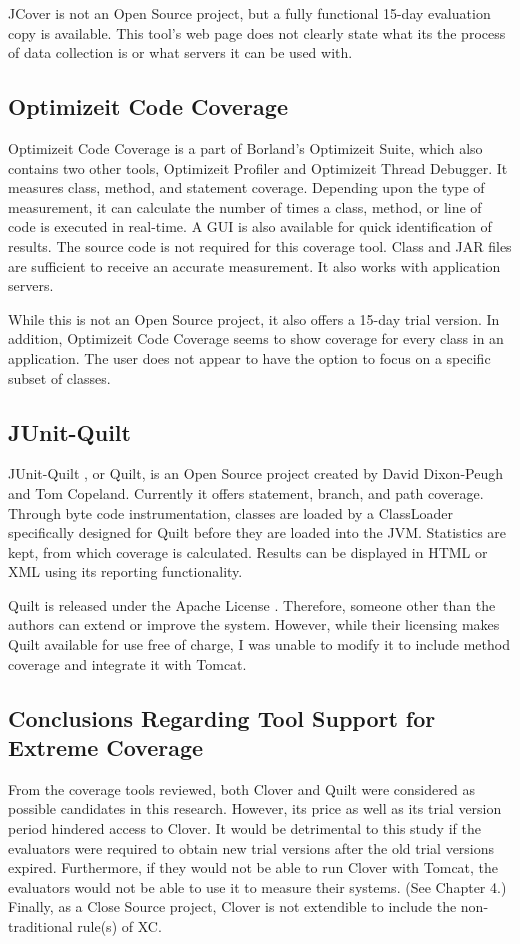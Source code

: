 JCover is not an Open Source project, but a fully functional 15-day
evaluation copy is available. This tool's web page does not clearly state
what its the process of data collection is or what servers it can be used
with.

\subsection{Optimizeit Code Coverage}
Optimizeit Code Coverage \cite{Optimizeit} is a part of Borland's
Optimizeit Suite, which also contains two other tools, Optimizeit Profiler
and Optimizeit Thread Debugger. It measures class, method, and statement
coverage. Depending upon the type of measurement, it can calculate the
number of times a class, method, or line of code is executed in
real-time. A GUI is also available for quick identification of results. The
source code is not required for this coverage tool. Class and JAR files are
sufficient to receive an accurate measurement. It also works with
application servers.

While this is not an Open Source project, it also offers a 15-day trial
version. In addition, Optimizeit Code Coverage seems to show coverage for
every class in an application. The user does not appear to have the option
to focus on a specific subset of classes.

\subsection{JUnit-Quilt}
JUnit-Quilt \cite{Quilt}, or Quilt, is an Open Source project created by
David Dixon-Peugh and Tom Copeland. Currently it offers statement, branch,
and path coverage. Through byte code instrumentation, classes are loaded by
a ClassLoader specifically designed for Quilt before they are loaded into
the JVM. Statistics are kept, from which coverage is calculated. Results
can be displayed in HTML or XML using its reporting functionality.

Quilt is released under the Apache License \cite{license:Apache}.
Therefore, someone other than the authors can extend or improve the
system. However, while their licensing makes Quilt available for use free
of charge, I was unable to modify it to include method coverage and
integrate it with Tomcat.

\subsection{Conclusions Regarding Tool Support for Extreme Coverage}
From the coverage tools reviewed, both Clover and Quilt were considered as
possible candidates in this research. However, its price as well as its
trial version period hindered access to Clover. It would be detrimental to
this study if the evaluators were required to obtain new trial versions
after the old trial versions expired. Furthermore, if they would not be
able to run Clover with Tomcat, the evaluators would not be able to use it
to measure their systems. (See Chapter 4.)  Finally, as a Close Source
project, Clover is not extendible to include the non-traditional rule(s) of
XC.

